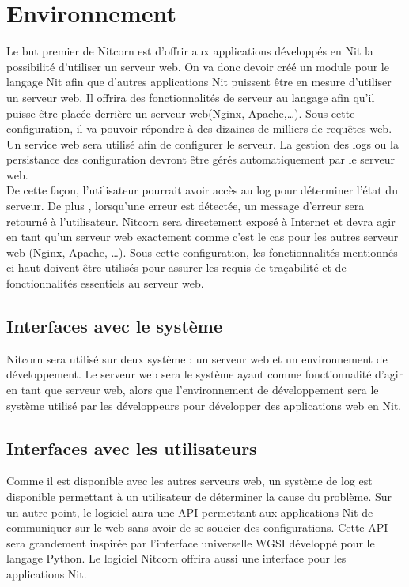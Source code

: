 \documentclass{scrreprt}
\begin{document}
\section{Environnement}
Le but premier de Nitcorn est d'offrir aux applications développés en Nit la possibilité
d'utiliser un serveur web. On va donc devoir créé un module pour le langage Nit afin que d'autres applications Nit puissent être en mesure d'utiliser un serveur web. Il offrira des fonctionnalités de serveur au langage afin qu'il puisse être placée derrière un serveur web(Nginx, Apache,\ldots). Sous cette configuration, il va pouvoir répondre à des dizaines de milliers de requêtes web. Un service web sera utilisé afin de configurer le serveur. La gestion des logs ou la persistance des configuration devront être gérés automatiquement par le serveur web.\\ De cette façon, l'utilisateur pourrait avoir accès au log pour déterminer l'état du serveur. De plus , lorsqu'une erreur est détectée, un message d'erreur sera retourné à l'utilisateur. Nitcorn sera directement exposé à Internet et devra agir en tant qu'un serveur web exactement comme c'est le cas pour les autres
serveur web (Nginx, Apache, \ldots). Sous cette configuration, les
fonctionnalités mentionnés ci-haut doivent être utilisés pour assurer les requis de traçabilité
et de fonctionnalités essentiels au serveur web.

\subsection{Interfaces avec le système}
Nitcorn sera utilisé sur deux système : un serveur web et un environnement de développement.
Le serveur web sera le système ayant comme fonctionnalité d'agir en tant que serveur web, alors
que l'environnement de développement sera le système utilisé par les développeurs
pour développer des applications web en Nit.

\subsection{Interfaces avec les utilisateurs}
Comme il est disponible avec les autres serveurs web, un système de log est
disponible permettant à un utilisateur de déterminer la cause du problème. Sur
un autre point, le logiciel aura une API permettant aux applications Nit de
communiquer sur le web sans avoir de se soucier des configurations. Cette
API sera grandement inspirée par l'interface universelle WGSI développé pour
le langage Python. Le logiciel Nitcorn offrira aussi une interface pour les
applications Nit.
\end{document}
